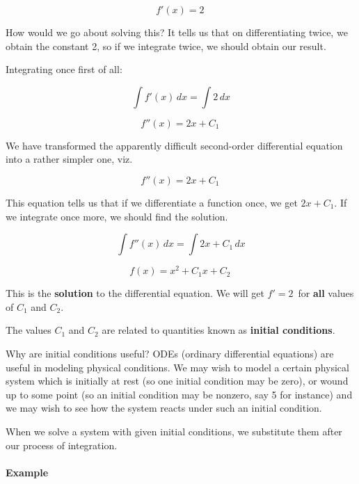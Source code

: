 $$f'(x) = 2 \,$$



How would we go about solving this? It tells us that on differentiating twice, we obtain the constant 2, so if we integrate twice, we should obtain our result.



Integrating once first of all:



$$\int f'(x) \,dx = \int 2 \,dx$$

$$f''(x) = 2x + C_1 \,$$



We have transformed the apparently difficult second-order differential equation into a rather simpler one, viz.



$$f''(x) = 2x + C_1 \,$$



This equation tells us that if we differentiate a function once, we get $2x + C_1$. If we integrate once more, we should find the solution.



$$\int f''(x) \,dx = \int 2x + C_1 \,dx$$ 

$$f(x) = x^2 + C_1 x + C_2 \,$$



This is the \textbf{solution} to the differential equation. We will get $f' = 2 \,$ for \textbf{all} values of $C_1$ and $C_2$.



The values $C_1$ and $C_2$ are related to quantities known as \textbf{initial conditions}.



Why are initial conditions useful? ODEs (ordinary differential equations) are useful in modeling physical conditions. We may wish to model a certain physical system which is initially at rest (so one initial condition may be zero), or wound up to some point (so an initial condition may be nonzero, say 5 for instance) and we may wish to see how the system reacts under such an initial condition.



When we solve a system with given initial conditions, we substitute them after our process of integration.



\paragraph{Example}

